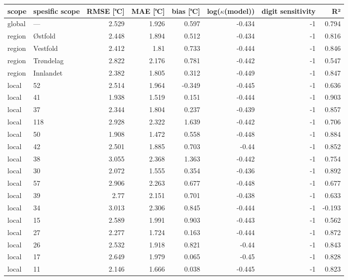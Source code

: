 \begin{tabular}{llrrrrrr}
\hline
 scope   & spesific
scope           &       RMSE
[℃] &   MAE [℃] &        bias
[℃] &   log($\kappa$(model)) &    digit
sensitivity &     R² \\
\hline
 global  & ---       & 2.529 &     1.926 &  0.597 &                 -0.434 & -1 &  0.794 \\
 region  & Østfold   & 2.448 &     1.894 &  0.512 &                 -0.434 & -1 &  0.816 \\
 region  & Vestfold  & 2.412 &     1.81  &  0.733 &                 -0.444 & -1 &  0.846 \\
 region  & Trøndelag & 2.822 &     2.176 &  0.781 &                 -0.442 & -1 &  0.547 \\
 region  & Innlandet & 2.382 &     1.805 &  0.312 &                 -0.449 & -1 &  0.847 \\
 local   & 52        & 2.514 &     1.964 & -0.349 &                 -0.445 & -1 &  0.636 \\
 local   & 41        & 1.938 &     1.519 &  0.151 &                 -0.444 & -1 &  0.903 \\
 local   & 37        & 2.344 &     1.804 &  0.237 &                 -0.439 & -1 &  0.857 \\
 local   & 118       & 2.928 &     2.322 &  1.639 &                 -0.442 & -1 &  0.706 \\
 local   & 50        & 1.908 &     1.472 &  0.558 &                 -0.448 & -1 &  0.884 \\
 local   & 42        & 2.501 &     1.885 &  0.703 &                 -0.44  & -1 &  0.852 \\
 local   & 38        & 3.055 &     2.368 &  1.363 &                 -0.442 & -1 &  0.754 \\
 local   & 30        & 2.072 &     1.555 &  0.354 &                 -0.436 & -1 &  0.892 \\
 local   & 57        & 2.906 &     2.263 &  0.677 &                 -0.448 & -1 &  0.677 \\
 local   & 39        & 2.77  &     2.151 &  0.701 &                 -0.438 & -1 &  0.633 \\
 local   & 34        & 3.013 &     2.306 &  0.845 &                 -0.444 & -1 & -0.193 \\
 local   & 15        & 2.589 &     1.991 &  0.903 &                 -0.443 & -1 &  0.562 \\
 local   & 27        & 2.277 &     1.724 &  0.163 &                 -0.444 & -1 &  0.872 \\
 local   & 26        & 2.532 &     1.918 &  0.821 &                 -0.44  & -1 &  0.843 \\
 local   & 17        & 2.649 &     1.979 &  0.065 &                 -0.45  & -1 &  0.828 \\
 local   & 11        & 2.146 &     1.666 &  0.038 &                 -0.445 & -1 &  0.823 \\
\hline
\end{tabular}